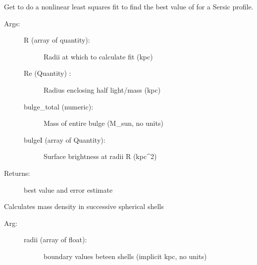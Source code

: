 \documentclass[letterpaper,10pt,english]{sphinxmanual}
\begin{document}
\begin{fulllineitems}

\begin{fulllineitems}
\label{\detokenize{massprofile:galaxy.massprofile.MassProfile.fit_sersic_n}}
Get  to do a non\sphinxhyphen{}linear least squares fit to find
the best value of  for a Sersic profile.
\begin{description}
\item[{Args:}] \leavevmode\begin{description}
\item[{R (array of quantity):}] \leavevmode
Radii at which to calculate fit (kpc)

\item[{Re (Quantity) :}] \leavevmode
Radius enclosing half light/mass (kpc)

\item[{bulge\_total (numeric):}] \leavevmode
Mass of entire bulge (M\_sun, no units)

\item[{bulgeI (array of Quantity):}] \leavevmode
Surface brightness at radii R (kpc\textasciicircum{}\sphinxhyphen{}2)

\end{description}

\item[{Returns:}] \leavevmode
best  value and error estimate

\end{description}

\end{fulllineitems}


\begin{fulllineitems}
\label{\detokenize{massprofile:galaxy.massprofile.MassProfile.density_profile_shell}}
Calculates mass density in successive spherical shells
\begin{description}
\item[{Arg:}] \leavevmode\begin{description}
\item[{radii (array of float):}] \leavevmode
boundary values beteen shells (implicit kpc, no units)


\end{description}
\end{description}
\end{fulllineitems}
\end{fulllineitems}
\end{document}
